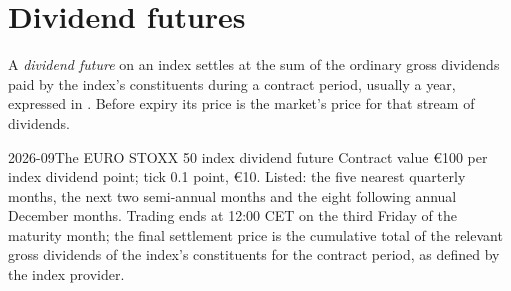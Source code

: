 \begin{omfigure}

\label{fig:m1:index-and-single-stock-futures-worldwide:relay}
\end{omfigure}

\section{Dividend futures}

\begin{definition}\label{def:m1:index-and-single-stock-futures-worldwide:divfut}
A \emph{dividend future} on an index settles at the
sum of the ordinary gross dividends paid by the index's constituents during
a contract period, usually a year, expressed in . Before expiry
its price is the market's price for that stream of dividends.
\end{definition}

\begin{dated}{2026-09}{The EURO STOXX 50 index dividend future}\label{dat:m1:index-and-single-stock-futures-worldwide:fexd}
Contract value \euro100 per index dividend point; tick 0.1 point, \euro10.
Listed: the five nearest quarterly months, the next two semi-annual months
and the eight following annual December months. Trading ends at 12:00 CET on
the third Friday of the maturity month; the final settlement price is the
cumulative total of the relevant gross dividends of the index's
constituents for the contract period, as defined by the index provider.
\end{dated}

